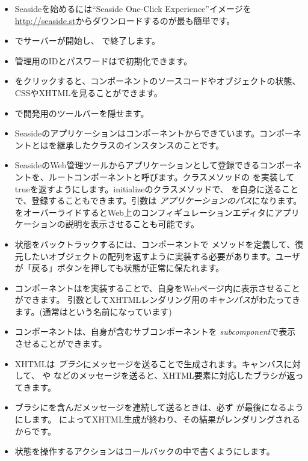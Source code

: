 \documentclass[a4paper,10pt,twoside]{book}
\begin{document}
\begin{itemize}
  \item Seasideを始めるには``Seaside One-Click Experience''イメージを \url{http://seaside.st}からダウンロードするのが最も簡単です。
  \item {} でサーバーが開始し、 で終了します。
  \item 管理用のIDとパスワードはで初期化できます。
  \item {} をクリックすると、コンポーネントのソースコードやオブジェクトの状態、CSSやXHTMLを見ることができます。
  \item {} で開発用のツールバーを隠せます。
  \item Seasideのアプリケーションはコンポーネントからできています。コンポーネントとはを継承したクラスのインスタンスのことです。
  \item SeasideのWeb管理ツールからアプリケーションとして登録できるコンポーネントを、ルートコンポーネントと呼びます。クラスメソッドの  を実装してtrueを返すようにします。initializeのクラスメソッドで、  を自身に送ることで、登録することもできます。引数は \emph{アプリケーションのパス}になります。
     をオーバーライドするとWeb上のコンフィギュレーションエディタにアプリケーションの説明を表示させることも可能です。
  \item 状態をバックトラックするには、コンポーネントで  メソッドを定義して、復元したいオブジェクトの配列を返すように実装する必要があります。ユーザが「戻る」ボタンを押しても状態が正常に保たれます。
  \item コンポーネントはを実装することで、自身をWebページ内に表示させることができます。
    引数としてXHTMLレンダリング用の\emph{キャンバス}がわたってきます。(通常はという名前になっています)
  \item コンポーネントは、自身が含むサブコンポーネントを  \emph{subcomponent}で表示させることができます。
  \item XHTMLは \emph{ブラシ}にメッセージを送ることで生成されます。キャンバスに対して、  や などのメッセージを送ると、XHTML要素に対応したブラシが返ってきます。
  \item ブラシにを含んだメッセージを連続して送るときは、必ず が最後になるようにします。
    によってXHTML生成が終わり、その結果がレンダリングされるからです。
  \item 状態を操作するアクションはコールバックの中で書くようにします。

\end{itemize}
\end{document}
